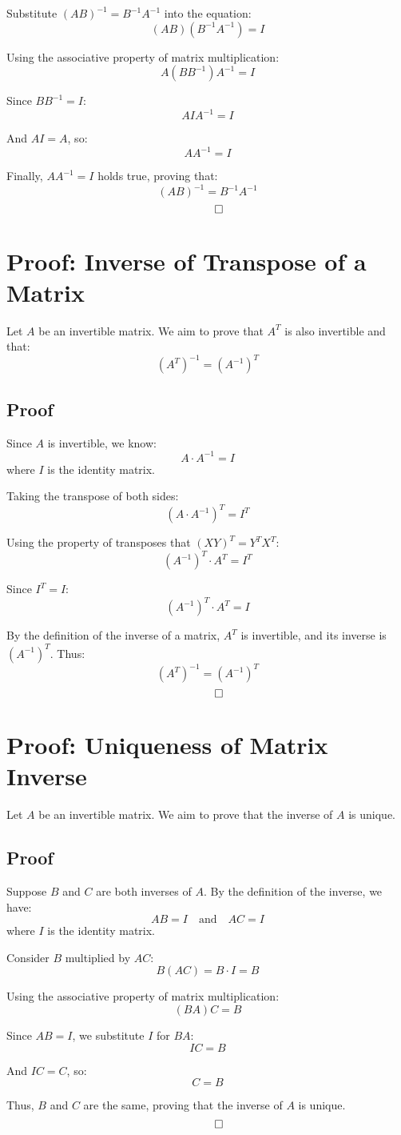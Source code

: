 \documentclass{article}
\begin{document}
Substitute \( (AB)^{-1} = B^{-1}A^{-1} \) into the equation:
\[
(AB)(B^{-1}A^{-1}) = I
\]

Using the associative property of matrix multiplication:
\[
A(BB^{-1})A^{-1} = I
\]

Since \( BB^{-1} = I \):
\[
AIA^{-1} = I
\]

And \( AI = A \), so:
\[
AA^{-1} = I
\]

Finally, \( AA^{-1} = I \) holds true, proving that:
\[
(AB)^{-1} = B^{-1}A^{-1}
\]
\[
\qed
\]

\section{Proof: Inverse of Transpose of a Matrix}
Let \( A \) be an invertible matrix. We aim to prove that \( A^T \) is also invertible and that:
\[
(A^T)^{-1} = (A^{-1})^T
\]

\subsection*{Proof}
Since \( A \) is invertible, we know:
\[
A \cdot A^{-1} = I
\]
where \( I \) is the identity matrix.

Taking the transpose of both sides:
\[
(A \cdot A^{-1})^T = I^T
\]

Using the property of transposes that \( (XY)^T = Y^T X^T \):
\[
(A^{-1})^T \cdot A^T = I^T
\]

Since \( I^T = I \):
\[
(A^{-1})^T \cdot A^T = I
\]

By the definition of the inverse of a matrix, \( A^T \) is invertible, and its inverse is \( (A^{-1})^T \). Thus:
\[
(A^T)^{-1} = (A^{-1})^T
\]
\[
\qed
\]

\section{Proof: Uniqueness of Matrix Inverse}
Let \( A \) be an invertible matrix. We aim to prove that the inverse of \( A \) is unique.

\subsection*{Proof}
Suppose \( B \) and \( C \) are both inverses of \( A \). By the definition of the inverse, we have:
\[
AB = I \quad \text{and} \quad AC = I
\]
where \( I \) is the identity matrix.

Consider \( B \) multiplied by \( AC \):
\[
B(AC) = B \cdot I = B
\]

Using the associative property of matrix multiplication:
\[
(BA)C = B
\]

Since \( AB = I \), we substitute \( I \) for \( BA \):
\[
IC = B
\]

And \( IC = C \), so:
\[
C = B
\]

Thus, \( B \) and \( C \) are the same, proving that the inverse of \( A \) is unique.
\[
\qed
\]
\end{document}
